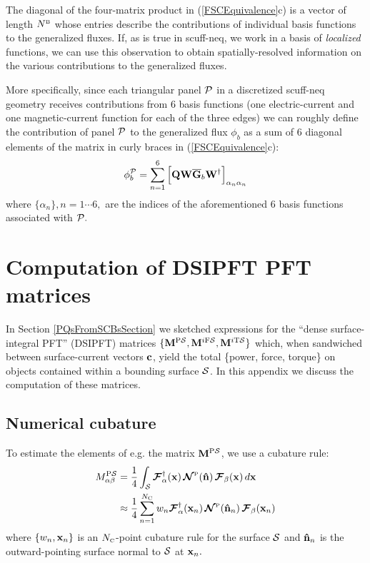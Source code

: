 \documentclass[letterpaper]{article}
\newcommand{\PS}{^{\text{\scriptsize P}\mc S}}
\newcommand{\IFS}{^{i\text{\scriptsize F}\mc S}}
\newcommand{\ITS}{^{i\text{\scriptsize T}\mc S}}
\begin{document}
The diagonal of the four-matrix product in (\ref{FSCEquivalence}c) 
is a vector of length $N^{\hbox{\tiny{B}}}$ whose entries describe the 
contributions of individual basis functions to the generalized
fluxes. If, as is true in {\sc scuff-neq}, we work in a basis
of \textit{localized} functions, we can use this observation 
to obtain spatially-resolved information on the various 
contributions to the generalized fluxes.

More specifically, since each triangular panel $\mathcal{P}$ 
in a discretized {\sc scuff-neq} geometry receives contributions 
from 6 basis functions (one electric-current and one magnetic-current
function for each of the three edges) we can roughly define the
contribution of panel $\mathcal{P}$ to the generalized flux $\phi_b$ 
as a sum of 6 diagonal elements of the matrix in curly braces
in (\ref{FSCEquivalence}c):
$$ \phi_{b}^{\mathcal{P}} 
   = 
   \sum_{n=1}^6
   \Big[\mathbf{Q} \mathbf{W} \overline{\mathbf{G}}_b \mathbf{W}^\dagger\Big]_{\alpha_n \alpha_n}
$$
where $\{\alpha_n\}, n=1\cdots 6,$ are the indices of the
aforementioned 6 basis functions associated with $\mathcal{P}.$

\appendix

\section{Computation of DSIPFT PFT matrices}

In Section \ref{PQsFromSCBsSection} we sketched expressions for
the ``dense surface-integral PFT'' (DSIPFT)
matrices $\{\vb M\PS, \vb M\IFS, \vb M\ITS\}$ which, when sandwiched
between surface-current vectors $\mathbf{c}$, yield the total
\{power, force, torque\} on objects contained within a bounding
surface $\mathcal{S}$. In this appendix we discuss the computation of 
these matrices.

\subsection{Numerical cubature}

To estimate the elements of e.g. the matrix $\vb M\PS$, we
use a cubature rule:
\begin{align}
  M_{\alpha\beta}\PS
 &= \frac{1}{4} \int_{\mc S} 
    \bmc F^\dagger_\alpha(\vb x) 
    \,
    \bmc N\supt{P}(\vbhat{n})
    \,
    \bmc F_\beta(\vb x) 
     \, d\vb x
\nn
 &\approx \frac{1}{4} \sum_{n=1}^{N\subt{C}} w_n 
    \bmc F^\dagger_\alpha(\vb x_n) 
    \,
    \bmc N\supt{P}(\vbhat{n}_n)
    \,
    \bmc F_\beta(\vb x_n) 
\label{MPSCubature}
\end{align}
where $\{w_n, \mathbf{x}_n\}$ is an $N_{\hbox{\tiny{C}}}$-point cubature rule 
for the surface $\mathcal{S}$ and $\mathbf{\hat n}_n$ is the outward-pointing
surface normal to $\mathcal{S}$ at $\mathbf{x}_n.$
 
\end{document}
